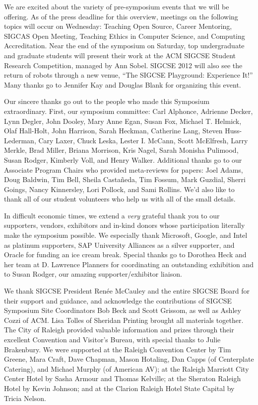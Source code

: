 We are excited about the variety of pre-symposium events that we will be offering. As of the press deadline for this overview, meetings on the following topics will occur on Wednesday: Teaching Open Source, Career Mentoring, SIGCAS Open Meeting, Teaching Ethics in Computer Science, and Computing Accreditation. Near the end of the symposium on Saturday, top undergraduate and graduate students will present their work at the ACM SIGCSE Student Research Competition, managed by Ann Sobel. SIGCSE 2012 will also see the return of robots through a new venue, “The SIGCSE Playground: Experience It!” Many thanks go to Jennifer Kay and Douglas Blank for organizing this event. 
\vspace{0.5\baselineskip}

Our sincere thanks go out to the people who made this Symposium extraordinary. First, our symposium committee: Carl Alphonce, Adrienne Decker, Lynn Degler, John Dooley, Mary Anne Egan, Susan Fox, Michael T. Helmick, Olaf Hall-Holt, John Harrison, Sarah Heckman, Catherine Lang, Steven Huss-Lederman, Cary Laxer, Chuck Leska, Lester I. McCann, Scott McElfresh, Larry Merkle, Brad Miller, Briana Morrison, Kris Nagel, Sarah Monisha Pulimood, Susan Rodger, Kimberly Voll, and Henry Walker. Additional thanks go to our Associate Program Chairs who provided meta-reviews for papers: Joel Adams, Doug Baldwin, Tim Bell, Sheila Castañeda, Tim Fossum, Mark Guzdial, Sherri Goings, Nancy Kinnersley, Lori Pollock, and Sami Rollins. We’d also like to thank all of our student volunteers who help us with all of the small details.
\vspace{0.5\baselineskip}

In difficult economic times, we extend a \textit{very} grateful thank you to our supporters, vendors, exhibitors and in-kind donors whose participation literally make the symposium possible. We especially thank Microsoft, Google, and Intel as platinum supporters, SAP University Alliances as a silver supporter, and Oracle for funding an ice cream break. Special thanks go to Dorothea Heck and her team at D. Lawrence Planners for coordinating an outstanding exhibition and to Susan Rodger, our amazing supporter/exhibitor liaison.
\vspace{0.5\baselineskip}

We thank SIGCSE President Renée McCauley and the entire SIGCSE Board for their support and guidance, and acknowledge the contributions of SIGCSE Symposium Site Coordinators Bob Beck and Scott Grissom, as well as Ashley Cozzi of ACM. Lisa Tolles of Sheridan Printing brought all materials together. The City of Raleigh provided valuable information and prizes through their excellent Convention and Visitor’s Bureau, with special thanks to Julie Brakenbury. We were supported at the Raleigh Convention Center by Tim Greene, Mara Craft, Dave Chapman, Mason Hotaling, Dan Capps (of Centerplate Catering), and Michael Murphy (of American AV); at the Raleigh Marriott City Center Hotel by Sasha Armour and Thomas Kelville; at the Sheraton Raleigh Hotel by Kevin Johnson; and at the Clarion Raleigh Hotel State Capital by Tricia Nelson.
\vspace{0.5\baselineskip}

